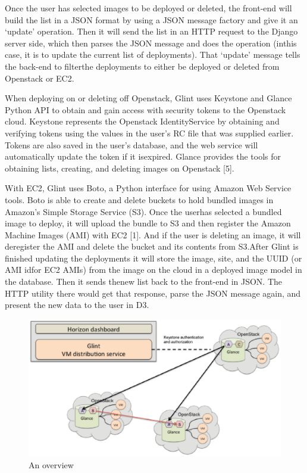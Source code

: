 \documentclass[a4paper]{jpconf}
\begin{document}
Once the user has selected images to be 
deployed or deleted, the front-end will build the list in a JSON format by using a JSON message factory 
and give it an ‘update’ operation. 
Then it will send the list in an HTTP request to the Django server side, which then parses the JSON 
message and does the operation (inthis case, it is to update the current list of deployments). 
That ‘update’ message tells the back-end to filterthe deployments to either be deployed or deleted from 
Openstack or EC2.

When deploying on or deleting off Openstack, Glint uses Keystone and Glance Python API to obtain 
and gain access with security tokens to the Openstack cloud. 
Keystone represents the Openstack IdentityService by obtaining and verifying tokens using the values in 
the user’s RC file that was supplied earlier.
Tokens are also saved in the user’s database, and the web service will 
automatically update the token if it isexpired. Glance provides the tools for obtaining lists, creating, and 
deleting images on Openstack [5].

With EC2, Glint uses Boto, a Python interface for using Amazon Web Service tools. 
Boto is able to create and delete buckets to hold bundled images in Amazon’s Simple Storage Service (S3). 
Once the userhas selected a bundled image to deploy, it will upload the bundle to S3 
and then register the Amazon Machine Images (AMI) with EC2 [1]. 
And if the user is deleting an image, it will deregister the AMI and delete the bucket 
and its contents from S3.After Glint is finished updating the deployments it will store the image, site, 
and the UUID (or AMI idfor EC2 AMIs) from the image on the cloud in a deployed image model in the database. 
Then it sends thenew list back to the front-end in JSON. The HTTP utility there would get that response, 
parse the JSON message again, and present the new data to the user in D3.


\begin{figure}[ht]
\begin{center}
\includegraphics[width=36pc]{GlintFigure.eps}
\caption{\label{fig:glintfigure}An overview 
}
\end{center}
\end{figure}
\end{document}
